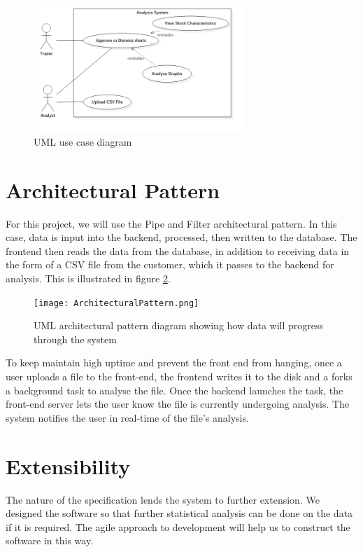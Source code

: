 \documentclass[11pt, oneside, a4paper]{article}
\begin{document}
\begin{figure}[h]
	\centering
		\includegraphics[width=300px]{UseCaseDiagram.png}
	\caption{UML use case diagram}
	\label{UseCase}
\end{figure}

\section{Architectural Pattern}
For this project, we will use the Pipe and Filter architectural pattern. In this
case, data is input into the backend, processed, then written to the database.
The frontend then reads the data from the database, in addition to receiving data in
the form of a CSV file from the customer, which it passes to the backend for analysis.
This is illustrated in figure \ref{ArchitechturalPattern}.

\begin{figure}[h]
	\centering
		\texttt{[image: ArchitecturalPattern.png]}
	\caption{UML architectural pattern diagram showing how data will progress through the system}
	\label{ArchitechturalPattern}
\end{figure}

To keep maintain high uptime and prevent the front end from hanging, once a user
uploads a file to the front-end, the frontend writes it to the disk and a forks a
background task to analyse the file. Once the backend launches the task, the front-end
server lets the user know the file is currently undergoing analysis. The system
notifies the user in real-time of the file’s analysis.

\section{Extensibility}
The nature of the specification lends the system to further extension. We designed
the software so that further statistical analysis can be done on the data if it is
required. The agile approach to development will help us to construct the software
in this way.
\end{document}
